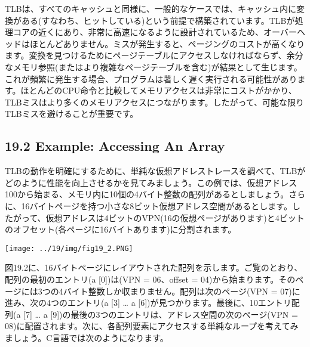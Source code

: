 TLBは、すべてのキャッシュと同様に、一般的なケースでは、キャッシュ内に変換がある(すなわち、ヒットしている)という前提で構築されています。TLBが処理コアの近くにあり、非常に高速になるように設計されているため、オーバーヘッドはほとんどありません。ミスが発生すると、ページングのコストが高くなります。変換を見つけるためにページテーブルにアクセスしなければならず、余分なメモリ参照(またはより複雑なページテーブルを含む)が結果として生じます。これが頻繁に発生する場合、プログラムは著しく遅く実行される可能性があります。ほとんどのCPU命令と比較してメモリアクセスは非常にコストがかかり、TLBミスはより多くのメモリアクセスにつながります。したがって、可能な限りTLBミスを避けることが重要です。

\hypertarget{example-accessing-an-array}{%
\subsection*{19.2 Example: Accessing An
Array}\label{example-accessing-an-array}}

TLBの動作を明確にするために、単純な仮想アドレストレースを調べて、TLBがどのように性能を向上させるかを見てみましょう。この例では、仮想アドレス100から始まる、メモリ内に10個の4バイト整数の配列があるとしましょう。さらに、16バイトページを持つ小さな8ビット仮想アドレス空間があるとします。したがって、仮想アドレスは4ビットのVPN(16の仮想ページがあります)と4ビットのオフセット(各ページに16バイトあります)に分割されます。

\texttt{[image: ../19/img/fig19\_2.PNG]}

図19.2に、16バイトページにレイアウトされた配列を示します。ご覧のとおり、配列の最初のエントリ(a
{[}0{]})は(VPN = 06、offset =
04)から始まります。そのページには3つの4バイト整数しか収まりません。配列は次のページ(VPN
= 07)に進み、次の4つのエントリ(a {[}3{]} \ldots{} a
{[}6{]})が見つかります。最後に、10エントリ配列(a {[}7{]} \ldots{} a
{[}9{]})の最後の3つのエントリは、アドレス空間の次のページ(VPN =
08)に配置されます。次に、各配列要素にアクセスする単純なループを考えてみましょう。C言語では次のようになります。

\begin{Shaded}
\begin{Highlighting}[]
\NormalTok{;}
\NormalTok{\}}
\end{Highlighting}
\end{Shaded}

